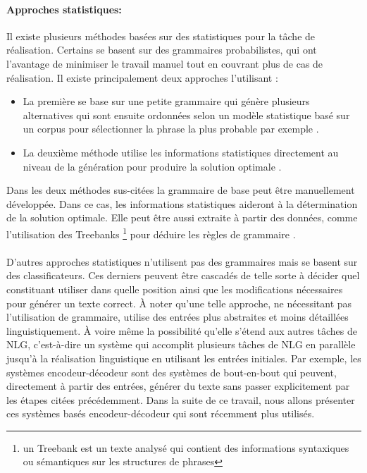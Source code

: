 \paragraph{Approches statistiques:} Il existe plusieurs méthodes basées sur des statistiques pour la tâche de réalisation. Certains se basent sur des grammaires probabilistes, qui ont l'avantage de minimiser le travail manuel tout en couvrant plus de cas de réalisation. Il existe principalement deux approches l'utilisant \citep{Gatt2018}:
\begin{itemize}
	\item La première se base sur une petite grammaire qui génère plusieurs alternatives qui sont ensuite ordonnées selon un modèle statistique basé sur un corpus pour sélectionner la phrase la plus probable par exemple \citep{LangkildeGeary2000}.
	\item La deuxième méthode utilise les informations statistiques directement au niveau de la génération pour produire la solution optimale \citep{Belz2008}.
\end{itemize}
Dans les deux méthodes sus-citées la grammaire de base peut être manuellement développée. Dans ce cas, les informations statistiques aideront à la détermination de la solution optimale. Elle peut être aussi extraite à partir des données, comme l'utilisation des Treebanks \footnote{un Treebank est un texte analysé qui contient des informations syntaxiques ou sémantiques sur les structures de phrases} pour déduire les règles de grammaire \citep{Espinosa2008}.
\paragraph{}
D'autres approches statistiques n'utilisent pas des grammaires mais se basent sur des classificateurs. Ces derniers peuvent être cascadés de telle sorte à décider quel constituant utiliser dans quelle position ainsi que les modifications nécessaires pour générer un texte correct. À noter qu'une telle approche, ne nécessitant pas l'utilisation de grammaire, utilise des entrées plus abstraites et moins détaillées linguistiquement. À voire même la possibilité qu'elle s'étend aux autres tâches de NLG, c'est-à-dire un système qui accomplit plusieurs tâches de NLG en parallèle jusqu'à la réalisation linguistique en utilisant les entrées initiales. Par exemple, les systèmes encodeur-décodeur sont des systèmes de bout-en-bout qui peuvent, directement à partir des entrées, générer du texte sans passer explicitement par les étapes citées précédemment. Dans la suite de ce travail, nous allons présenter ces systèmes basés encodeur-décodeur qui sont récemment plus utilisés.

